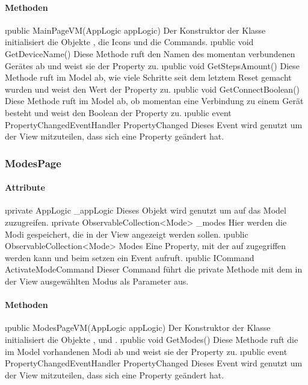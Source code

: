 \documentclass[../entwurf.tex]{subfiles}
\begin{document}
\paragraph{Methoden}
\begin{itemize}
	\i{public MainPageVM(AppLogic appLogic)} Der Konstruktor der Klasse initialisiert die Objekte , die Icons und die Commands.
	\i{public void GetDeviceName()} Diese Methode ruft den Namen des momentan verbundenen Gerätes ab und weist sie der Property  zu.
	\i{public void GetStepsAmount()} Diese Methode ruft im Model ab, wie viele Schritte seit dem letztem Reset gemacht wurden und weist den Wert der Property  zu.
	\i{public void GetConnectBoolean()} Diese Methode ruft im Model ab, ob momentan eine Verbindung zu einem Gerät besteht und weist den Boolean der Property  zu.
	\i{public event PropertyChangedEventHandler PropertyChanged} Dieses Event wird genutzt um der View mitzuteilen, dass sich eine Property geändert hat.
\end{itemize}
\subsubsection{ModesPage}
\paragraph{Attribute}
\begin{itemize}
	\i{private AppLogic \_appLogic} Dieses Objekt wird genutzt um auf das Model zuzugreifen.
	\i{private ObservableCollection<Mode> \_modes} Hier werden die Modi gespeichert, die in der View angezeigt werden sollen.
	\i{public ObservableCollection<Mode> Modes} Eine Property, mit der auf  zugegriffen werden kann und beim setzen ein Event aufruft.
	\i{public ICommand ActivateModeCommand} Dieser Command führt die private Methode  mit dem in der View ausgewählten Modus als Parameter aus.
\end{itemize}
\paragraph{Methoden}
\begin{itemize}
	\i{public ModesPageVM(AppLogic appLogic)} Der Konstruktor der Klasse initialisiert die Objekte ,  und .
	\i{public void GetModes()} Diese Methode ruft die im Model vorhandenen Modi ab und weist sie der Property  zu.
	\i{public event PropertyChangedEventHandler PropertyChanged} Dieses Event wird genutzt um der View mitzuteilen, dass sich eine Property geändert hat.
\end{itemize}
\end{document}
